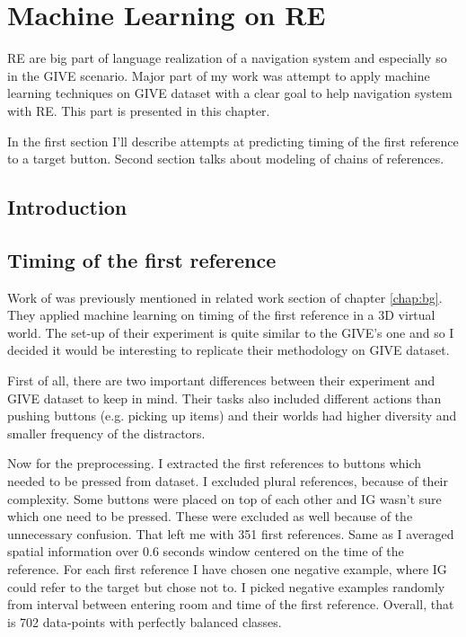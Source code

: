 \chapter{Machine Learning on RE}
RE are big part of language realization of a navigation system and especially so in the GIVE scenario. Major part of my work was attempt to apply machine learning techniques on GIVE dataset with a clear goal to help navigation system with RE. This part is presented in this chapter.

In the first section I'll describe attempts at predicting timing of the first reference to a target button. Second section talks about modeling of chains of references.

\section{Introduction}
\section{Timing of the first reference}
Work of \citet{stoia2006sentence} was previously mentioned in related work section of chapter \ref{chap:bg}. They applied machine learning on timing of the first reference in a 3D virtual world. The set-up of their experiment is quite similar to the GIVE's one and so I decided it would be interesting to replicate their methodology on GIVE dataset. 

First of all, there are two important differences between their experiment and GIVE dataset to keep in mind. Their tasks also included different actions than pushing buttons (e.g. picking up items) and their worlds had higher diversity and smaller frequency of the distractors.

Now for the preprocessing. I extracted the first references to buttons which needed to be pressed from dataset. I excluded plural references, because of their complexity. Some buttons were placed on top of each other and IG wasn't sure which one need to be pressed. These were excluded as well because of the unnecessary confusion. That left me with 351 first references. Same as \citet{stoia2006sentence} I averaged spatial information over 0.6 seconds window centered on the time of the reference. For each first reference I have chosen one negative example, where IG could refer to the target but chose not to. I picked negative examples randomly from interval between entering room and time of the first reference. Overall, that is 702 data-points with perfectly balanced classes.

